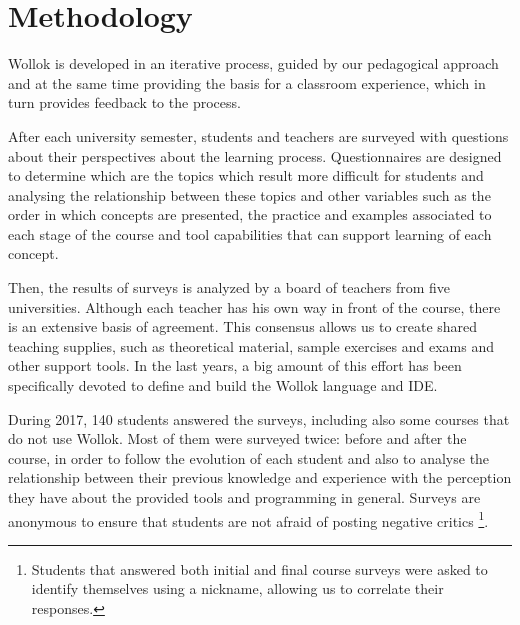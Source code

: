 \section{Methodology}
\label{sec:methodology}
Wollok is developed in an iterative process, guided by our pedagogical approach 
and at the same time providing the basis for a classroom experience, 
which in turn provides feedback to the process.

After each university semester, students and teachers are surveyed with questions about their perspectives about the learning process.
Questionnaires are designed to determine which are the topics which result more difficult for students 
and analysing the relationship between these topics and other variables such as 
the order in which concepts are presented,
the practice and examples associated to each stage of the course
and tool capabilities that can support learning of each concept.

Then, the results of surveys is analyzed by a board of teachers from five universities.
Although each teacher has his own way in front of the course, there is an extensive basis of agreement.
This consensus allows us to create shared teaching supplies, such as theoretical material, sample exercises and exams and other support tools.
In the last years, a big amount of this effort has been specifically devoted to define and build the Wollok language and IDE.

\medskip

During 2017, 140 students answered the surveys, including also some courses that do not use Wollok.
Most of them were surveyed twice: before and after the course, in order to follow the evolution of each student
and also to analyse the relationship between their previous knowledge and experience with the perception they have about the provided tools and programming in general.
Surveys are anonymous to ensure that students are not afraid of posting negative critics%
\footnote{Students that answered both initial and final course surveys were asked to identify themselves using a nickname, allowing us to correlate their responses.}.


